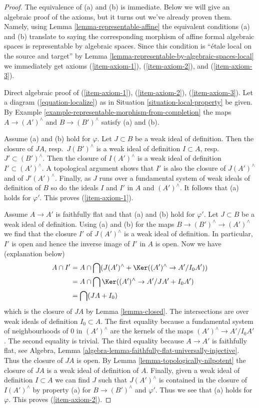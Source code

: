 \begin{proof}
The equivalence of (a) and (b) is immediate. Below we will give an
algebraic proof of the axioms, but it turns out we've already proven
them. Namely, using Lemma \ref{lemma-representable-affine}
the equivalent conditions (a) and (b) translate to saying the
corresponding morphism of affine formal algebraic spaces is representable
by algebraic spaces.
Since this condition is ``\'etale local on the source and target'' by
Lemma \ref{lemma-representable-by-algebraic-spaces-local}
we immediately get axioms (\ref{item-axiom-1}), (\ref{item-axiom-2}), and
(\ref{item-axiom-3}).

\medskip\noindent
Direct algebraic proof of (\ref{item-axiom-1}), (\ref{item-axiom-2}),
(\ref{item-axiom-3}). Let a diagram (\ref{equation-localize}) as in
Situation \ref{situation-local-property} be given.
By Example \ref{example-representable-morphism-from-completion}
the maps $A \to (A')^\wedge$ and $B \to (B')^\wedge$
satisfy (a) and (b).

\medskip\noindent
Assume (a) and (b) hold for $\varphi$. Let $J \subset B$ be a weak ideal
of definition. Then the closure of $JA$, resp.\ $J(B')^\wedge$
is a weak ideal of definition $I \subset A$, resp.\ $J' \subset (B')^\wedge$.
Then the closure of $I(A')^\wedge$ is a weak ideal of definition
$I' \subset (A')^\wedge$. A topological argument shows that $I'$ is also
the closure of $J(A')^\wedge$ and of $J'(A')^\wedge$.
Finally, as $J$ runs over a fundamental system of weak ideals of definition
of $B$ so do the ideals $I$ and $I'$ in $A$ and $(A')^\wedge$.
It follows that (a) holds for $\varphi'$. This proves (\ref{item-axiom-1}).

\medskip\noindent
Assume $A \to A'$ is faithfully flat and that (a) and (b) hold for $\varphi'$.
Let $J \subset B$ be a weak ideal of definition. Using (a) and (b)
for the maps $B \to (B')^\wedge \to (A')^\wedge$ we find that the
closure $I'$ of $J(A')^\wedge$ is a weak ideal of definition.
In particular, $I'$ is open and hence the inverse image of $I'$
in $A$ is open. Now we have (explanation below)
\begin{align*}
A \cap I'
& =
A \cap \bigcap (J(A')^\wedge + \Ker((A')^\wedge \to A'/I_0A')) \\
& =
A \cap \bigcap \Ker((A')^\wedge \to A'/JA' + I_0 A') \\
& = \bigcap (JA + I_0)
\end{align*}
which is the closure of $JA$ by Lemma \ref{lemma-closed}.
The intersections are over weak ideals of definition $I_0 \subset A$.
The first equality because a fundamental system of neighbourhoods of
$0$ in $(A')^\wedge$ are the kernels of the maps $(A')^\wedge \to A'/I_0A'$.
The second equality is trivial. The third equality because $A \to A'$
is faithfully flat, see
Algebra, Lemma \ref{algebra-lemma-faithfully-flat-universally-injective}.
Thus the closure of $JA$ is open. By Lemma \ref{lemma-topologically-nilpotent}
the closure of $JA$
is a weak ideal of definition of $A$. Finally, given a weak
ideal of definition $I \subset A$ we can find $J$ such that
$J(A')^\wedge$ is contained in the closure of $I(A')^\wedge$
by property (a) for $B \to (B')^\wedge$ and $\varphi'$.
Thus we see that (a) holds for $\varphi$. This proves (\ref{item-axiom-2}).


\end{proof}
